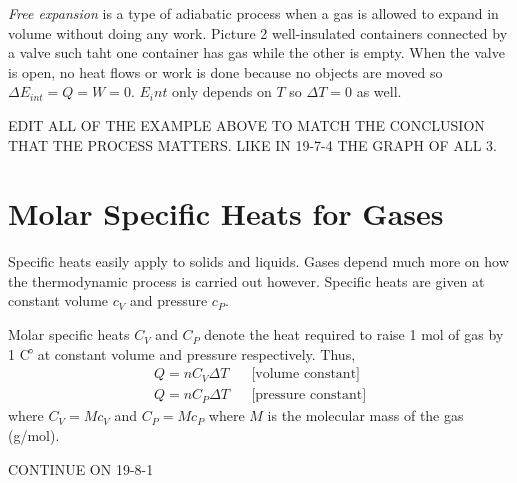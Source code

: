 \begin{definition}
    \emph{Free expansion} is a type of adiabatic process when a gas is allowed to expand in volume without doing any work. Picture 2 well-insulated containers connected by a valve such taht one container has gas while the other is empty. When the valve is open, no heat flows or work is done because no objects are moved so $\Delta E_{int} = Q = W = 0$. $E_int$ only depends on $T$ so $\Delta T = 0$ as well.
\end{definition}


EDIT ALL OF THE EXAMPLE ABOVE TO MATCH THE CONCLUSION THAT THE PROCESS MATTERS. LIKE IN 19-7-4 THE GRAPH OF ALL 3.

\section{Molar Specific Heats for Gases}

\begin{remark}
    Specific heats easily apply to solids and liquids. Gases depend much more on how the thermodynamic process is carried out however. Specific heats are given at constant volume $c_V$ and pressure $c_P$.
\end{remark}
\begin{definition}
    Molar specific heats $C_V$ and $C_P$ denote the heat required to raise 1 mol of gas by 1 C$\operatorname{\!^{\circ}\!}$ at constant volume and pressure respectively. Thus,
    \begin{align*}
        Q = nC_V\Delta T && \text{[volume constant]} \\
        Q = nC_P\Delta T && \text{[pressure constant]}
    \end{align*}
    where $C_V = Mc_V$ and $C_P = Mc_P$ where $M$ is the molecular mass of the gas (g/mol).
\end{definition}


CONTINUE ON 19-8-1